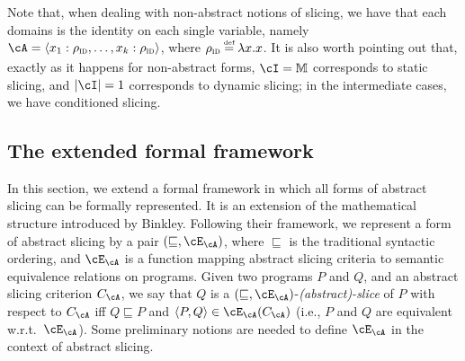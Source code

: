 \documentclass[prodmode,acmtocl]{acmsmall}
\newcommand{\caX}{\cX}
\def\prog{\ensuremath{P}\xspace}
\def\progq{\ensuremath{Q}\xspace}
\def\memory{\ensuremath{\mu}\xspace}
\def\memories{\ensuremath{\mathbb{M}}\xspace}
\def\crit{\ensuremath{C}\xspace}
\def\uco{\ensuremath{\rho}\xspace}
\def\defi{\mbox{\raisebox{0ex}[1ex][1ex]{$\stackrel{\mbox{\tiny
def}}{\; =\;}$}}}
\newcommand{\COMMENT} [1]{}
\newcommand{\true}{\mbox{\sl true}}
\def\tuple#1{\langle #1 \rangle}
\newcommand{\0}{\mbox{\bf 0}}
\newtheorem{mydefinition}[theorem]{Definition}
\def\IDDOM{\ensuremath{\uco_{\textsc{id}}}\xspace}
\begin{document}
Note that, when dealing with non-abstract notions of slicing, we have
that each domains is the identity on each single variable, namely $\cA
= \tuple{x_1:\IDDOM, \ldots,x_k:\IDDOM}$, where $\IDDOM \defi \lambda
x. x$.
It is also worth pointing out that, exactly as it happens for
non-abstract forms, $\cI = \memories$ corresponds to static slicing,
and $|\cI| = 1$ corresponds to dynamic slicing; in the intermediate
cases, we have conditioned slicing.

\COMMENT{
\begin{mydefinition}[Abstract slicing]
  \label{def:AbstractSlicing} Let $\prog$ and $\progq$ be executable
  programs such that $\progq$ is obtained from $\prog$ by removing
  zero or more statements, and let $\crit_\cA =
  (\cI,\caX,\cO,\psi,\cA)$, with $\cA \defi \tuple{X_1:\uco_1, \ldots, X_k:\uco_k}$.  
  $\progq$ is an \emph{abstract slice} of
  $\prog$ with respect to $\crit_\cA$ if (1) for each
  $\memory \in \cI$, when the execution of $\prog$ from input
  $\memory$ reaches a point (or occurrence) in $\cO$, the execution of
  $\progq$ from $\memory$ reaches $\cO$ as well; and (2) for each $i \in [1,k]$, each $X_i$
  has the same property $\uco_i$ both in $\prog$ and in $\progq$,
  i.e., $\uco_i(\memory'_i) = \uco_i(\memory''_i)$ where $\memory'_i$
  and $\memory''_i$ are the current memories of $\prog$ and $\progq$,
  respectively.  Moreover, if $\psi = \true$, then the executions of
  $\prog$ and $\progq$ have to follow identical paths as explained in
  Definition \ref{def:UnifiedEquivalence}.
\end{mydefinition}}

\subsection{The extended formal framework}
\label{subsection:theFormalFramework}

In this section, we extend a formal framework in which all forms of abstract
slicing can be formally represented.  It is an extension of the
mathematical structure introduced by Binkley.  Following their framework, we represent a
form of abstract slicing by a pair $(\sqsubseteq, \cE_{\cA})$, where
$\sqsubseteq$ is the traditional syntactic ordering, and $\cE_{\cA}$
is a function mapping abstract slicing criteria to semantic
equivalence relations on programs.  Given two programs $\prog$ and
$\progq$, and an abstract slicing criterion $\crit_\cA$, we say that
$\progq$ is a $(\sqsubseteq, \cE_{\cA})$-\emph{(abstract)-slice} of
$\prog$ with respect to $\crit_\cA$ iff $\progq \sqsubseteq \prog$ and
$\tuple{\prog,\progq} \in \cE_{\cA}(\crit_\cA)$ (i.e., $\prog$ and $\progq$
are equivalent w.r.t.~$\cE_{\cA}$).  Some preliminary notions are
needed to define $\cE_{\cA}$ in the context of abstract slicing.
\end{document}
